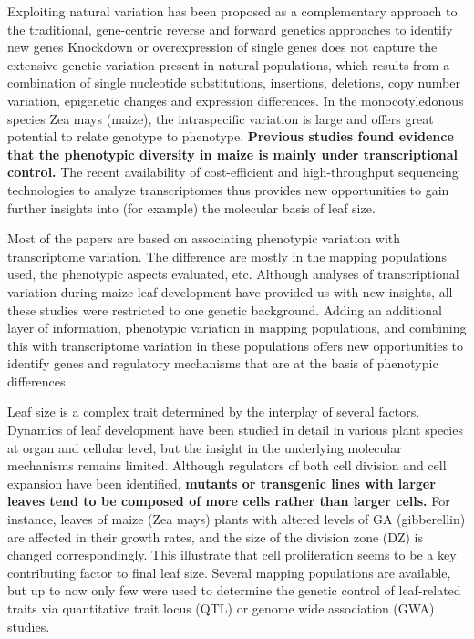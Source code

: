 \documentclass[a4paper,10pt]{article}
\begin{document}
\begin{description}
\item[Identification of new genes:] Exploiting natural variation has been proposed as a complementary approach to the traditional, gene-centric reverse and forward genetics approaches to identify new genes
Knockdown or overexpression of single genes does not capture the extensive genetic variation present in natural populations, which results from a combination of single nucleotide substitutions, insertions, deletions, copy number variation, epigenetic changes and expression differences.
In the monocotyledonous species Zea mays (maize), the intraspecific variation is large and offers great potential to relate genotype to phenotype. 
\textbf{Previous studies found evidence that the phenotypic diversity in maize is mainly under transcriptional control.} 
The recent availability of cost-efficient and high-throughput sequencing technologies to analyze transcriptomes thus provides new opportunities to gain further insights into (for example) the molecular basis of leaf size.

\item Most of the papers are based on associating phenotypic variation with transcriptome variation. The difference are mostly in the mapping populations used, the phenotypic aspects evaluated, etc.
Although analyses of transcriptional variation during maize leaf development have provided us with new insights, all these studies were restricted to one genetic background. Adding
an additional layer of information, phenotypic variation in mapping populations, and combining this with transcriptome variation in these populations offers new
opportunities to identify genes and regulatory mechanisms that are at the basis of phenotypic differences


\item[Leaf size:]
Leaf size is a complex trait determined by the interplay of several factors. 
Dynamics of leaf development have been studied in detail in various plant species at organ and cellular level, but the insight in the underlying molecular mechanisms remains limited.
Although regulators of both cell division and cell expansion have been identified, \textbf{mutants or transgenic lines with larger leaves tend to be composed of more cells rather than larger cells.}
For instance, leaves of maize (Zea mays) plants with altered levels of GA (gibberellin) are affected in their growth rates, and the size of the division zone (DZ) is changed correspondingly.
This illustrate that cell proliferation seems to be a key contributing factor to final leaf size.
Several mapping populations are available, but up to now only few were used to determine the genetic control of leaf-related traits via quantitative trait locus (QTL) or genome wide association (GWA) studies.


\end{description}
\end{document}

